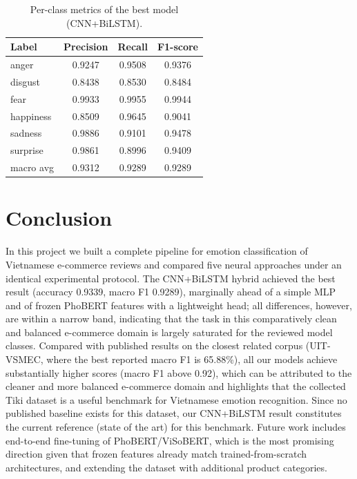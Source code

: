 \documentclass[11pt]{article}
\begin{document}
\begin{table}[h]
\centering
\caption{Per-class metrics of the best model (CNN+BiLSTM).}
\label{tab:perclass}
\begin{tabular}{lccc}
\hline
Label & Precision & Recall & F1-score \\
\hline
anger & 0.9247 & 0.9508 & 0.9376 \\
disgust & 0.8438 & 0.8530 & 0.8484 \\
fear & 0.9933 & 0.9955 & 0.9944 \\
happiness & 0.8509 & 0.9645 & 0.9041 \\
sadness & 0.9886 & 0.9101 & 0.9478 \\
surprise & 0.9861 & 0.8996 & 0.9409 \\
\hline
macro avg & 0.9312 & 0.9289 & 0.9289 \\
\hline
\end{tabular}
\end{table}

\section{Conclusion}
In this project we built a complete pipeline for emotion classification of Vietnamese e-commerce reviews and compared five neural approaches under an identical experimental protocol. The CNN+BiLSTM hybrid achieved the best result (accuracy 0.9339, macro F1 0.9289), marginally ahead of a simple MLP and of frozen PhoBERT features with a lightweight head; all differences, however, are within a narrow band, indicating that the task in this comparatively clean and balanced e-commerce domain is largely saturated for the reviewed model classes. Compared with published results on the closest related corpus (UIT-VSMEC, where the best reported macro F1 is 65.88\%), all our models achieve substantially higher scores (macro F1 above 0.92), which can be attributed to the cleaner and more balanced e-commerce domain and highlights that the collected Tiki dataset is a useful benchmark for Vietnamese emotion recognition. Since no published baseline exists for this dataset, our CNN+BiLSTM result constitutes the current reference (state of the art) for this benchmark. Future work includes end-to-end fine-tuning of PhoBERT/ViSoBERT, which is the most promising direction given that frozen features already match trained-from-scratch architectures, and extending the dataset with additional product categories.
\end{document}
